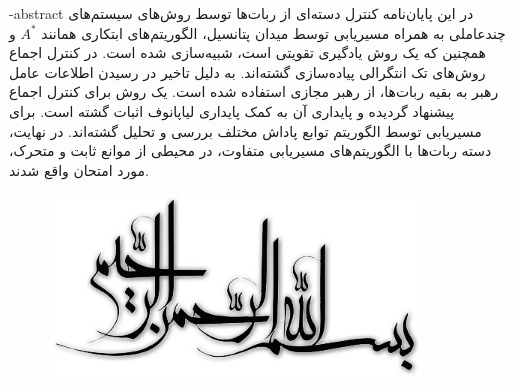 
\fa-abstract{
در این پایان‌نامه کنترل دسته‌ای از ربات‌ها توسط روش‌های سیستم‌های چندعاملی به همراه مسیریابی توسط میدان پتانسیل، الگوریتم‌های ابتکاری همانند $A^*$ و همچنین  که یک روش یادگیری تقویتی است، شبیه‌سازی شده است. در کنترل اجماع روش‌های تک انتگرالی پیاده‌سازی گشته‌اند. به دلیل تاخیر در رسیدن اطلاعات عامل رهبر به بقیه ربات‌ها، از رهبر مجازی استفاده شده است. یک روش برای کنترل اجماع پیشنهاد گردیده و پایداری آن به کمک پایداری لیاپانوف اثبات گشته است. برای مسیریابی توسط الگوریتم  توابع پاداش مختلف بررسی و تحلیل گشته‌اند. در نهایت، دسته ربات‌ها با الگوریتم‌های مسیریابی متفاوت، در محیطی از موانع ثابت و متحرک، مورد امتحان واقع شدند.
}





\AUTtitle
\vspace*{7cm}
\thispagestyle{empty}
\begin{center}
\includegraphics[height=5cm,width=12cm]{besm}
\end{center}